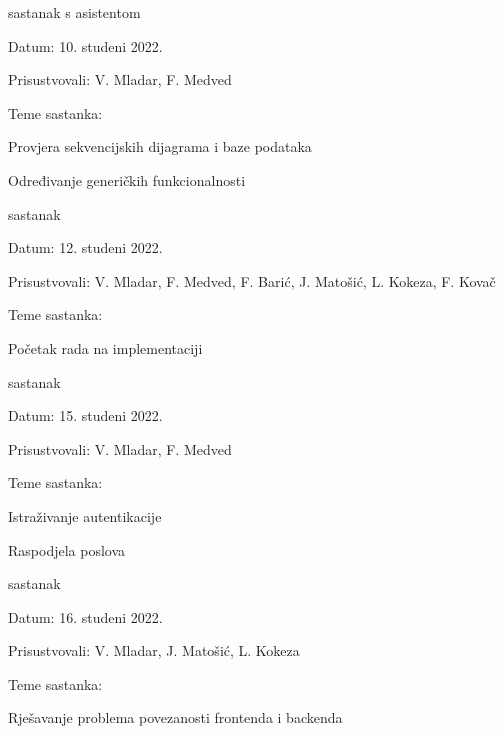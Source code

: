 \begin{packed_enum}
			\item  sastanak s asistentom
			\item[] \begin{packed_item}
				\item Datum: 10. studeni 2022.
				\item Prisustvovali: V. Mladar, F. Medved
				\item Teme sastanka:
				\begin{packed_item}
					\item  Provjera sekvencijskih dijagrama i baze podataka
					\item  Određivanje generičkih funkcionalnosti
				\end{packed_item}
			\end{packed_item}
			\bigskip

			\item  sastanak
			\item[] \begin{packed_item}
				\item Datum: 12. studeni 2022.
				\item Prisustvovali: V. Mladar, F. Medved, F. Barić, J. Matošić, L. Kokeza, F. Kovač
				\item Teme sastanka:
				\begin{packed_item}
					\item  Početak rada na implementaciji
				\end{packed_item}
			\end{packed_item}
			\bigskip

			\item  sastanak
			\item[] \begin{packed_item}
				\item Datum: 15. studeni 2022.
				\item Prisustvovali: V. Mladar, F. Medved
				\item Teme sastanka:
				\begin{packed_item}
					\item  Istraživanje autentikacije
					\item  Raspodjela poslova
				\end{packed_item}
			\end{packed_item}
			\bigskip

			\item  sastanak
			\item[] \begin{packed_item}
				\item Datum: 16. studeni 2022.
				\item Prisustvovali: V. Mladar, J. Matošić, L. Kokeza
				\item Teme sastanka:
				\begin{packed_item}
					\item  Rješavanje problema povezanosti frontenda i backenda
				\end{packed_item}
			\end{packed_item}
			\bigskip


\end{packed_enum}
